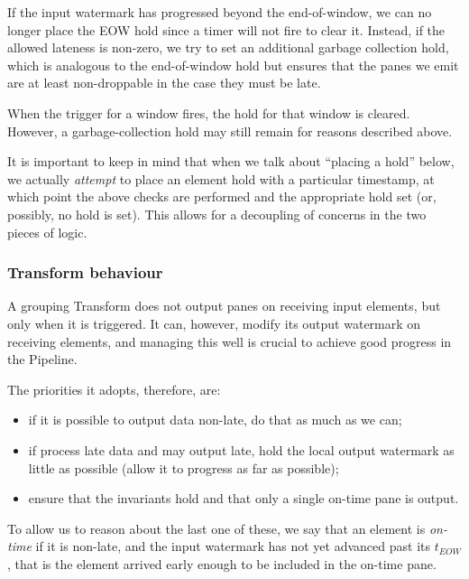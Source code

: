 If the input watermark has progressed beyond the end-of-window, we can no longer place the EOW hold since a timer will not fire to clear it.
Instead, if the allowed lateness is non-zero, we try to set an additional garbage collection hold, which is analogous to the end-of-window hold but ensures that the panes we emit are at least non-droppable in the case they must be late.

When the trigger for a window fires, the hold for that window is cleared.
However, a garbage-collection hold may still remain for reasons described above.

It is important to keep in mind that when we talk about ``placing a hold'' below, we actually \emph{attempt} to place an element hold with a particular timestamp, at which point the above checks are performed and the appropriate hold set (or, possibly, no hold is set).
This allows for a decoupling of concerns in the two pieces of logic.


\subsubsection{Transform behaviour}

A grouping Transform does not output panes on receiving input elements, but only when it is triggered.
It can, however, modify its output watermark on receiving elements, and managing this well is crucial to achieve good progress in the Pipeline.

The priorities it adopts, therefore, are:
\begin{itemize}
	\item if it is possible to output data non-late, do that as much as we can;
	\item if process late data and may output late, hold the local output watermark as little as possible (allow it to progress as far as possible);
	\item ensure that the invariants hold and that only a single on-time pane is output.
\end{itemize}

To allow us to reason about the last one of these, we say that an element is \emph{on-time} if it is non-late, and the input watermark has not yet advanced past its $t_{\mathit{EOW}}$, that is the element arrived early enough to be included in the on-time pane.

